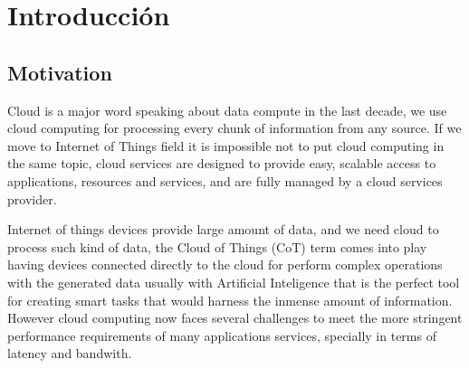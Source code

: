 
\cleardoublepage


\chapter{Introducción}
\label{makereference}



\section{Motivation}
\label{makereference1.1}

Cloud is a major word speaking about data compute in the last decade, we use cloud computing for processing every chunk of information from any source. 
If we move to Internet of Things field it is impossible not to put cloud computing in the same topic, cloud services are designed to provide easy, scalable access to applications, resources and services, and are fully managed by a cloud services provider.~\cite{cloud_def}  

Internet of things devices provide large amount of data, and we need cloud to process such kind of data, the Cloud of Things (CoT) term comes into play having devices connected directly to the cloud for perform complex operations with the generated data usually with Artificial Inteligence that is the perfect tool for creating smart tasks that would harness the inmense amount of information.
However cloud computing now faces several challenges to meet the more stringent performance requirements of many applications services, specially in terms of latency and bandwith.~\cite{IEE:Morabito:2017}

